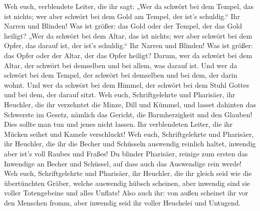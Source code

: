  Weh euch, verblendete Leiter, die ihr sagt: „Wer da
schwört bei dem Tempel, das ist nichts; wer aber schwört bei dem Gold am
Tempel, der ist's schuldig.``  Ihr Narren und Blinden!
Was ist größer: das Gold oder der Tempel, der das Gold heiligt?
 „Wer da schwört bei dem Altar, das ist nichts; wer aber
schwört bei dem Opfer, das darauf ist, der ist's schuldig.``
 Ihr Narren und Blinden! Was ist größer: das Opfer oder
der Altar, der das Opfer heiligt?  Darum, wer da schwört
bei dem Altar, der schwört bei demselben und bei allem, was darauf ist.
 Und wer da schwört bei dem Tempel, der schwört bei
demselben und bei dem, der darin wohnt.  Und wer da
schwört bei dem Himmel, der schwört bei dem Stuhl Gottes und bei dem,
der darauf sitzt.  Weh euch, Schriftgelehrte und
Pharisäer, ihr Heuchler, die ihr verzehntet die Minze, Dill und Kümmel,
und lasset dahinten das Schwerste im Gesetz, nämlich das Gericht, die
Barmherzigkeit und den Glauben! Dies sollte man tun und jenes nicht
lassen.  Ihr verblendeten Leiter, die ihr Mücken seihet
und Kamele verschluckt!  Weh euch, Schriftgelehrte und
Pharisäer, ihr Heuchler, die ihr die Becher und Schüsseln auswendig
reinlich haltet, inwendig aber ist's voll Raubes und Fraßes!
 Du blinder Pharisäer, reinige zum ersten das Inwendige
an Becher und Schüssel, auf dass auch das Auswendige rein werde!
 Weh euch, Schriftgelehrte und Pharisäer, ihr Heuchler,
die ihr gleich seid wie die übertünchten Gräber, welche auswendig hübsch
scheinen, aber inwendig sind sie voller Totengebeine und alles Unflats!
 Also auch ihr: von außen scheinet ihr vor den Menschen
fromm, aber inwendig seid ihr voller Heuchelei und Untugend.

